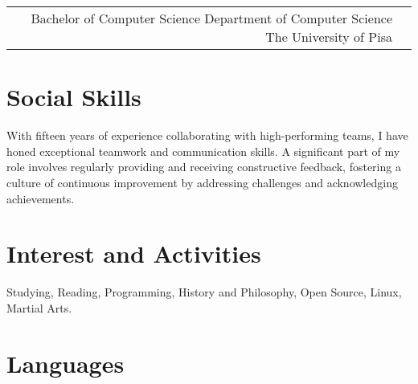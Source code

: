 \documentclass[10pt]{article} %
\begin{document}
\begin{paracol}{2}


\begin{supertabular}{rl} %


	{Bachelor of Computer Science} %
	{} %
	{Department of Computer Science} %
	{The University of Pisa} %


\end{supertabular}

\section{Social Skills}

With fifteen years of experience collaborating with high-performing teams, I have honed
exceptional teamwork and communication skills. A significant part of my role involves regularly
providing and receiving constructive feedback, fostering a culture of continuous improvement
by addressing challenges and acknowledging achievements.


\section{Interest and Activities}

\large Studying, Reading, Programming, History and Philosophy, Open Source, Linux, Martial Arts.

\medskip %


\section{Languages}


\end{paracol}
\end{document}
